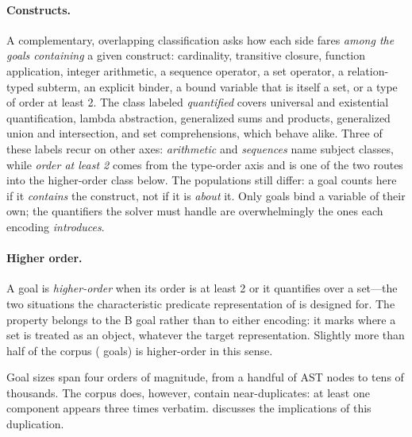 \paragraph*{Constructs.}
A complementary, overlapping classification asks how each side fares \emph{among the goals containing} a given construct: cardinality, transitive closure, function application, integer arithmetic, a sequence operator, a set operator, a relation-typed subterm, an explicit binder, a bound variable that is itself a set, or a type of order at least 2.
The class labeled \emph{quantified} covers universal and existential quantification, lambda abstraction, generalized sums and products, generalized union and intersection, and set comprehensions, which behave alike.
Three of these labels recur on other axes: \emph{arithmetic} and \emph{sequences} name subject classes, while \emph{order at least 2} comes from the type-order axis and is one of the two routes into the higher-order class below.
The populations still differ: a goal counts here if it \emph{contains} the construct, not if it is \emph{about} it.
Only \bmQuantified{} goals bind a variable of their own; the quantifiers the solver must handle are overwhelmingly the ones each encoding \emph{introduces}.

\paragraph*{Higher order.}
A goal is \emph{higher-order} when its order is at least 2 or it quantifies over a set---the two situations the characteristic predicate representation of  is designed for.
The property belongs to the B goal rather than to either encoding: it marks where a set is treated as an object, whatever the target representation.
Slightly more than half of the corpus (\bmHOn{} goals) is higher-order in this sense.

Goal sizes span four orders of magnitude, from a handful of AST nodes to tens of thousands.
The corpus does, however, contain near-duplicates: at least one component appears three times verbatim.
 discusses the implications of this duplication.
